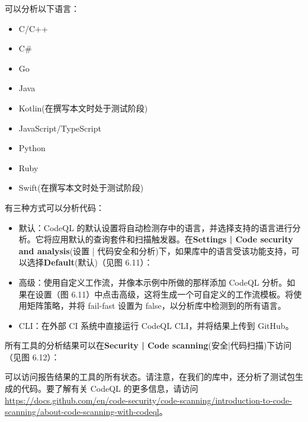 可以分析以下语言：

\begin{itemize}
\item 
C/C++

\item 
C\#

\item 
Go

\item 
Java

\item 
Kotlin(在撰写本文时处于测试阶段)

\item 
JavaScript/TypeScript

\item 
Python

\item 
Ruby

\item 
Swift(在撰写本文时处于测试阶段)
\end{itemize}

有三种方式可以分析代码：

\begin{itemize}
\item 
默认：CodeQL 的默认设置将自动检测存中的语言，并选择支持的语言进行分析。它将应用默认的查询套件和扫描触发器。在\textbf{Settings | Code security and analysis}(设置 | 代码安全和分析)下，如果库中的语言受该功能支持，可以选择\textbf{Default}(默认)（见图 6.11）：


\item 
高级：使用自定义工作流，并像本示例中所做的那样添加 CodeQL 分析。如果在设置（图 6.11）中点击高级，这将生成一个可自定义的工作流模板。将使用矩阵策略，并将 fail-fast 设置为 false，以分析库中检测到的所有语言。

\item 
CLI：在外部 CI 系统中直接运行 CodeQL CLI，并将结果上传到 GitHub。
\end{itemize}

所有工具的分析结果可以在\textbf{Security | Code scanning}(安全|代码扫描)下访问（见图 6.12）：


可以访问报告结果的工具的所有状态。请注意，在我们的库中，还分析了测试包生成的代码。要了解有关 CodeQL 的更多信息，请访问\url{https://docs.github.com/en/code-security/code-scanning/introduction-to-code-scanning/about-code-scanning-with-codeql}。

